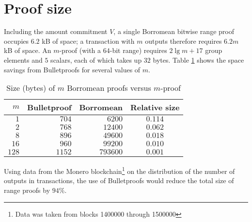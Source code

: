 \documentclass{mrl}
\begin{document}
\section{Proof size}
Including the amount commitment $V$, a single Borromean bitwise range proof occupies $6.2$ kB of space; a transaction with $m$ outputs therefore requires $6.2m$ kB of space. An $m$-proof (with a $64$-bit range) requires $2\lg m + 17$ group elements and $5$ scalars, each of which takes up $32$ bytes. Table \ref{table:size} shows the space savings from Bulletproofs for several values of $m$.

\begin{table}[h]
\begin{center}
\begin{tabular}{r|rr|c}
$m$ & Bulletproof & Borromean & Relative size \\
\hline
$1$   & $704$  & $6200$   & $0.114$ \\
$2$   & $768$  & $12400$  & $0.062$ \\
$8$   & $896$  & $49600$  & $0.018$ \\
$16$  & $960$  & $99200$  & $0.010$ \\
$128$ & $1152$ & $793600$ & $0.001$
\end{tabular}
\caption{Size (bytes) of $m$ Borromean proofs versus $m$-proof}
\label{table:size}
\end{center}
\end{table}

Using data from the Monero blockchain\footnote{Data was taken from blocks 1400000 through 1500000} on the distribution of the number of outputs in transactions, the use of Bulletproofs would reduce the total size of range proofs by $94\%$.



\end{document}
